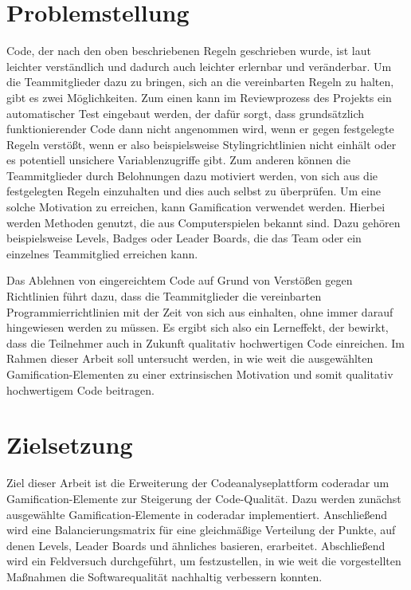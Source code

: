 \documentclass[fontsize=11pt, paper=a4, parskip=half]{scrartcl}
\begin{document}
\section{Problemstellung}
Code, der nach den oben beschriebenen Regeln geschrieben wurde, ist laut \cite{PJ2015} leichter verständlich und dadurch auch leichter erlernbar und veränderbar.
Um die Teammitglieder dazu zu bringen, sich an die vereinbarten Regeln zu halten, gibt es zwei Möglichkeiten.
Zum einen kann im Reviewprozess des Projekts ein automatischer Test eingebaut werden, der dafür sorgt, dass grundsätzlich funktionierender Code dann nicht angenommen wird, wenn er gegen festgelegte Regeln verstößt, wenn er also beispielsweise Stylingrichtlinien nicht einhält oder es potentiell unsichere Variablenzugriffe gibt.
Zum anderen können die Teammitglieder durch Belohnungen dazu motiviert werden, von sich aus die festgelegten Regeln einzuhalten und dies auch selbst zu überprüfen. 
Um eine solche Motivation zu erreichen, kann Gamification verwendet werden.
Hierbei werden Methoden genutzt, die aus Computerspielen bekannt sind.
Dazu gehören beispielsweise Levels, Badges oder Leader Boards, die das Team oder ein einzelnes Teammitglied erreichen kann. 

Das Ablehnen von eingereichtem Code auf Grund von Verstößen gegen Richtlinien führt dazu, dass die Teammitglieder die vereinbarten Programmierrichtlinien mit der Zeit von sich aus einhalten, ohne immer darauf hingewiesen werden zu müssen.
Es ergibt sich also ein Lerneffekt, der bewirkt, dass die Teilnehmer auch in Zukunft qualitativ hochwertigen Code einreichen.
Im Rahmen dieser Arbeit soll untersucht werden, in wie weit die ausgewählten Gamification-Elementen zu einer extrinsischen Motivation und somit qualitativ hochwertigem Code beitragen.

\section{Zielsetzung}
Ziel dieser Arbeit ist die Erweiterung der Codeanalyseplattform coderadar um Gamification-Elemente zur Steigerung der Code-Qualität.
Dazu werden zunächst ausgewählte Gamification-Elemente in coderadar implementiert.
Anschließend wird eine Balancierungsmatrix für eine gleichmäßige Verteilung der Punkte, auf denen Levels, Leader Boards und ähnliches basieren, erarbeitet.
Abschließend wird ein Feldversuch durchgeführt, um festzustellen, in wie weit die vorgestellten Maßnahmen die Softwarequalität nachhaltig verbessern konnten.
\end{document}
